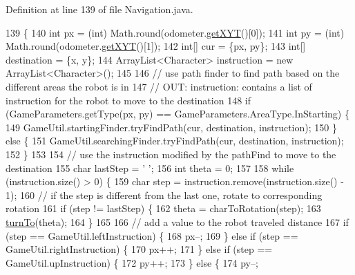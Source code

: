Definition at line 139 of file Navigation.\+java.


\begin{DoxyCode}
139                                                                   \{
140     \textcolor{keywordtype}{int} px = (int) Math.round(odometer.\hyperlink{classca_1_1mcgill_1_1ecse211_1_1odometer_1_1_odometer_data_a8f40f0264c68f0cbed4fff1723ae7863}{getXYT}()[0]);
141     \textcolor{keywordtype}{int} py = (int) Math.round(odometer.\hyperlink{classca_1_1mcgill_1_1ecse211_1_1odometer_1_1_odometer_data_a8f40f0264c68f0cbed4fff1723ae7863}{getXYT}()[1]);
142     \textcolor{keywordtype}{int}[] cur = \{px, py\};
143     \textcolor{keywordtype}{int}[] destination = \{x, y\};
144     ArrayList<Character> instruction = \textcolor{keyword}{new} ArrayList<Character>();
145 
146     \textcolor{comment}{// use path finder to find path based on the different areas the robot is in}
147     \textcolor{comment}{// OUT: instruction: contains a list of instruction for the robot to move to the destination}
148     \textcolor{keywordflow}{if} (GameParameters.getType(px, py) == GameParameters.AreaType.InStarting) \{
149       GameUtil.startingFinder.tryFindPath(cur, destination, instruction);
150     \} \textcolor{keywordflow}{else} \{
151       GameUtil.searchingFinder.tryFindPath(cur, destination, instruction);
152     \}
153 
154     \textcolor{comment}{// use the instruction modified by the pathFind to move to the destination}
155     \textcolor{keywordtype}{char} lastStep = \textcolor{charliteral}{' '};
156     \textcolor{keywordtype}{int} theta = 0;
157 
158     \textcolor{keywordflow}{while} (instruction.size() > 0) \{
159       \textcolor{keywordtype}{char} step = instruction.remove(instruction.size() - 1);
160       \textcolor{comment}{// if the step is different from the last one, rotate to corresponding rotation}
161       \textcolor{keywordflow}{if} (step != lastStep) \{
162         theta = charToRotation(step);
163         \hyperlink{classca_1_1mcgill_1_1ecse211_1_1project_1_1_navigation_a3bbe0645f2b3b3d0986b4a707fb5a00c}{turnTo}(theta);
164       \}
165 
166       \textcolor{comment}{// add a value to the robot traveled distance}
167       \textcolor{keywordflow}{if} (step == GameUtil.leftInstruction) \{
168         px--;
169       \} \textcolor{keywordflow}{else} \textcolor{keywordflow}{if} (step == GameUtil.rightInstruction) \{
170         px++;
171       \} \textcolor{keywordflow}{else} \textcolor{keywordflow}{if} (step == GameUtil.upInstruction) \{
172         py++;
173       \} \textcolor{keywordflow}{else} \{
174         py--;

\end{DoxyCode}
